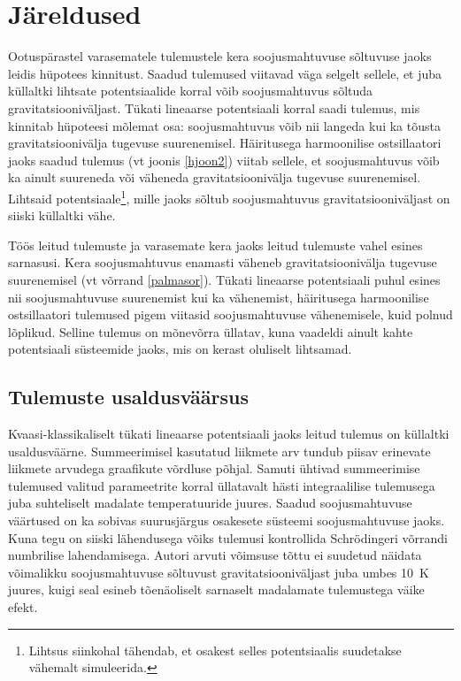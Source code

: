 \documentclass{trkut}%
\begin{document}
\section{Järeldused}

Ootuspärastel varasematele tulemustele kera soojusmahtuvuse sõltuvuse jaoks leidis hüpotees kinnitust.
Saadud tulemused viitavad väga selgelt sellele, et juba küllaltki lihtsate potentsiaalide korral võib soojusmahtuvus sõltuda gravitatsiooniväljast.
Tükati lineaarse potentsiaali korral saadi tulemus, mis kinnitab hüpoteesi mõlemat osa: soojusmahtuvus võib nii langeda kui ka tõusta gravitatsioonivälja tugevuse suurenemisel.
Häiritusega harmoonilise ostsillaatori jaoks saadud tulemus (vt joonis \ref{hjoon2}) viitab sellele, et soojusmahtuvus võib ka ainult suureneda või väheneda gravitatsioonivälja tugevuse suurenemisel.
Lihtsaid potentsiaale\footnote{Lihtsus siinkohal tähendab, et osakest selles potentsiaalis suudetakse vähemalt simuleerida.}, mille jaoks sõltub soojusmahtuvus gravitatsiooniväljast on siiski küllaltki vähe.

Töös leitud tulemuste ja varasemate kera jaoks leitud tulemuste vahel esines sarnasusi.
Kera soojusmahtuvus enamasti väheneb gravitatsioonivälja tugevuse suurenemisel (vt võrrand \eqref{palmasor}).
Tükati lineaarse potentsiaali puhul esines nii soojusmahtuvuse suurenemist kui ka vähenemist, häiritusega harmoonilise ostsillaatori tulemused pigem viitasid soojusmahtuvuse vähenemisele, kuid polnud lõplikud.
Selline tulemus on mõnevõrra üllatav, kuna vaadeldi ainult kahte potentsiaali süsteemide jaoks, mis on kerast oluliselt lihtsamad.


\subsection{Tulemuste usaldusväärsus}

Kvaasi-klassikaliselt tükati lineaarse potentsiaali jaoks leitud tulemus on küllaltki usaldusväärne.
Summeerimisel kasutatud liikmete arv tundub piisav erinevate liikmete arvudega graafikute võrdluse põhjal.
Samuti ühtivad summeerimise tulemused valitud parameetrite korral üllatavalt hästi integraalilise tulemusega juba suhteliselt madalate temperatuuride juures.
Saadud soojusmahtuvuse väärtused on ka sobivas suurusjärgus osakesete süsteemi soojusmahtuvuse jaoks.
Kuna tegu on siiski lähendusega võiks tulemusi kontrollida Schrödingeri võrrandi numbrilise lahendamisega.
Autori arvuti võimsuse tõttu ei suudetud näidata võimalikku soojusmahtuvuse sõltuvust gravitatsiooniväljast juba umbes \SI{10}{K} juures, kuigi seal esineb tõenäoliselt sarnaselt madalamate tulemustega väike efekt.
\end{document}
